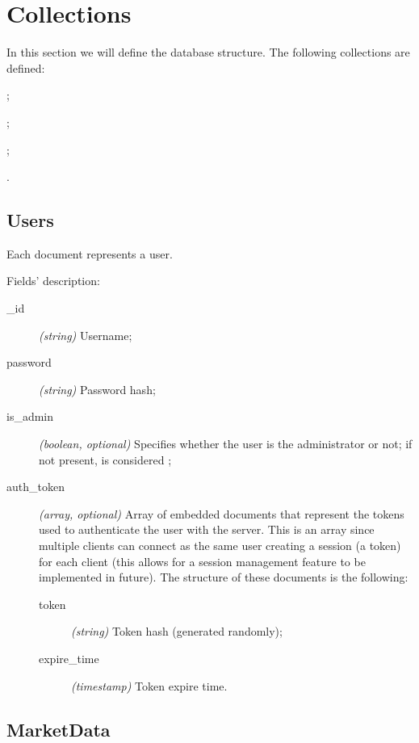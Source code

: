 \section{Collections}\label{sec:collections}

In this section we will define the database structure. The following collections
are defined:
\begin{enumerate*}[label=]
	\item {};
	\item {};
	\item {};
	\item {}.
\end{enumerate*}

\subsection{Users}



Each document represents a user.

Fields' description:
\begin{description}
	\item[\_id] \textit{(string)} Username;
	\item[password] \textit{(string)} Password hash;
	\item[is\_admin] \textit{(boolean, optional)} Specifies whether the user
		is the administrator or not; if not present, is considered
		;
	\item[auth\_token] \textit{(array, optional)} Array of embedded
		documents that represent the tokens used to authenticate the
		user with the server. This is an array since multiple clients
		can connect as the same user creating a session (a token) for
		each client (this allows for a session management feature to be
		implemented in future). The structure of these documents is the
		following:
		\begin{description}
			\item[token] \textit{(string)} Token hash (generated
				randomly);
			\item[expire\_time] \textit{(timestamp)} Token expire
				time.
		\end{description}
\end{description}

\subsection{MarketData}

